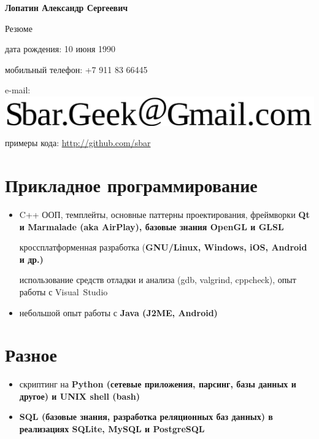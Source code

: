 \begin{center}
\fontsize{16pt}{14pt}\selectfont
\bfseries Лопатин Александр Сергеевич\mdseries

\fontsize{14pt}{14pt}\selectfont
Резюме
\end{center}
{
\fontsize{12pt}{12pt}\selectfont
\begin{flushright}
\item дата рождения: 10 июня 1990
\item мобильный телефон: +7 911 83 66445
\item e-mail: \includegraphics[scale=0.2]{email}
\item примеры кода: \url{http://github.com/sbar}
\end{flushright}
}

\setcounter{section}{0}
\section{Прикладное программирование}
\begin{itemize}
\item C++
\subitem ООП, темплейты, основные паттерны проектирования,
фреймворки
\bfseries Qt \mdseries и
\bfseries Marmalade \mdseries
(aka \bfseries AirPlay\mdseries),
базовые знания \bfseries OpenGL \mdseries и \bfseries GLSL\mdseries

\subitem кроссплатформенная разработка
(\bfseries GNU/Linux\mdseries, Windows, iOS, \bfseries Android \mdseries и др.)

\subitem использование средств отладки и анализа (gdb, valgrind, cppcheck),
опыт работы с Visual~Studio

\item небольшой опыт работы с \bfseries Java \mdseries (J2ME, Android)
\end{itemize}

\section{Разное}
\begin{itemize}
\item скриптинг на \bfseries Python \mdseries
(сетевые приложения, парсинг, базы данных и другое) и
\bfseries UNIX shell (bash)\mdseries
\item \bfseries SQL \mdseries (базовые знания, разработка реляционных баз данных)
в реализациях SQLite, MySQL и PostgreSQL
\end{itemize}

